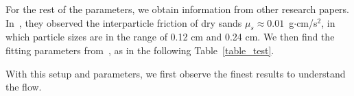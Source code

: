 For the rest of the parameters, we obtain information from other research papers.
In~\cite{senetakis_inter-particle_2013}, they observed the interparticle friction of dry sands $\mu_s \approx 0.01$~g$\cdot$cm/s$^2$, in which particle sizes are in the range of 0.12 cm and 0.24 cm. 
We then find the fitting parameters from~\cite{srivastava_viscometric_2021}, as in the following Table~\ref{table_test}. 
\begin{table}[ht]
\caption{Fitting parameters of granular materials when the interparticle friction~$\mu_s = 0.01$~\cite{srivastava_viscometric_2021}.
}
\label{table_test}
\end{table}
With this setup and parameters, we first observe the finest results to understand the flow.  
